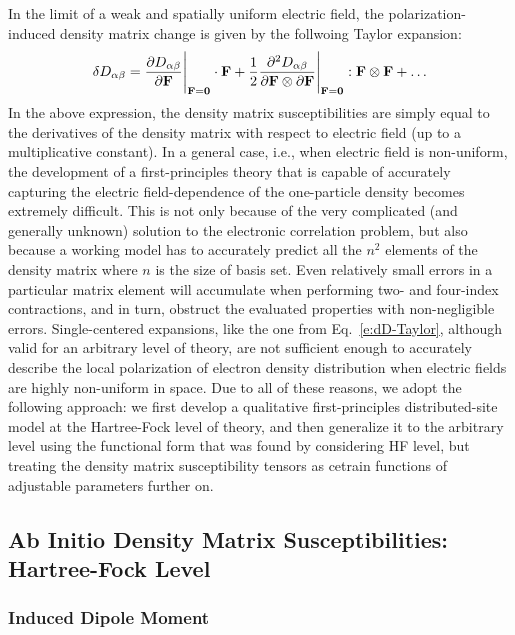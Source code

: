 \documentclass[aip,amsmath,amssymb,reprint,floatfix]{revtex4-1}
\begin{document}
In the limit of a weak and spatially uniform electric field,
the polarization\hyp{}induced density matrix change is given by the follwoing Taylor expansion:
%
\begin{equation}\label{e:dD-Taylor}
 \delta D_{\alpha\beta} = \frac{\partial D_{\alpha\beta}}{\partial {\bf F}}\Bigg|_{{\bf F}={\bf 0}}  \cdot {\bf F} 
   + \frac{1}{2} 
     \frac{\partial^2 D_{\alpha\beta}}{\partial {\bf F} \otimes \partial {\bf F}}\Bigg|_{{\bf F}={\bf 0}} : {\bf F} \otimes {\bf F}
   + \ldots 
\end{equation}
%
In the above expression, the density matrix susceptibilities are simply equal to the derivatives of the density matrix
with respect to electric field (up to a multiplicative constant).
In a general case, i.e., when electric field is non\hyp{}uniform, the development of a first\hyp{}principles theory
that is capable of accurately capturing the electric field\hyp{}dependence of the one\hyp{}particle density
becomes extremely difficult. This is not only because of the very complicated (and generally unknown) solution
to the electronic correlation problem, but also because
a working model has to accurately predict all the $n^2$ elements of the density matrix
where $n$ is the size of basis set. Even relatively small errors
in a particular matrix element will accumulate when performing two\hyp{}
and four\hyp{}index contractions,
and in turn, obstruct the evaluated properties with non\hyp{}negligible errors.
Single\hyp{}centered expansions, like the one from Eq.~\eqref{e:dD-Taylor}, although valid for 
an arbitrary level of theory,
are not sufficient enough to accurately describe the local polarization
of electron density distribution when electric fields are highly non\hyp{}uniform in space.
Due to all of these reasons, we adopt the following approach: 
we first develop a qualitative first\hyp{}principles distributed\hyp{}site model at the Hartree\hyp{}Fock
level of theory, and then generalize it to the arbitrary level using the functional form that was found 
by considering HF level,
but treating the density matrix susceptibility tensors as cetrain functions of adjustable parameters further on.

\subsection{Ab Initio Density Matrix Susceptibilities: Hartree-Fock Level}

\subsubsection{Induced Dipole Moment}
\end{document}
